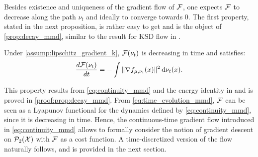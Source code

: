 Besides existence and uniqueness of the gradient flow of ${{\mathcal F}}$, one expects ${{\mathcal F}}$ to decrease along the path $\nu_t$ and ideally to converge towards $0$. The first property, stated in the next proposition, is rather easy to get and is the object of \cref{prop:decay_mmd}, similar to the result for KSD flow in \cite[Section 3.1]{Mroueh:2019}.
\begin{proposition}\label{prop:decay_mmd}
	Under \cref{assump:lipschitz_gradient_k}, ${{\mathcal F}}(\nu_t)$ is decreasing in time and satisfies:
	\begin{align}\label{eq:time_evolution_mmd}
		\frac{d{{\mathcal F}}(\nu_t)}{dt}= - \int \Vert \nabla f_{\mu,\nu_t}(x) \Vert^2 \mathop{}\!\mathrm{d} \nu_t(x).  
	\end{align}
\end{proposition}
This property results from \cref{eq:continuity_mmd} and the energy identity in \cite[Theorem 11.3.2]{ambrosio2008gradient} and is proved in \cref{proof:prop:decay_mmd}. %
From \cref{eq:time_evolution_mmd}, ${{\mathcal F}}$ can be seen as a Lyapunov functional for the dynamics defined by \cref{eq:continuity_mmd}, since it is decreasing in time. Hence, the continuous-time gradient flow introduced in \cref{eq:continuity_mmd} allows to formally consider the notion of gradient descent on $\mathcal{P}_2({{\mathcal X}})$ with ${{\mathcal F}}$ as a cost function.
A time-discretized version of the flow naturally follows, and is provided in the next section.
